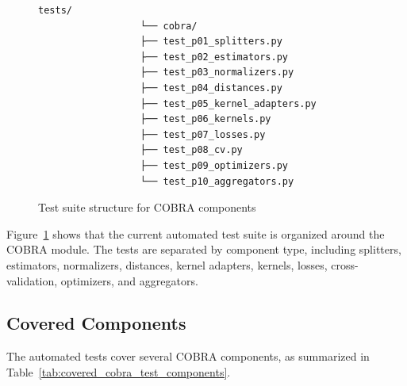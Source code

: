 \begin{figure}[H]
      \centering
      \begin{minipage}{0.85\textwidth}
            \begin{Verbatim}[fontsize=\footnotesize, baselinestretch=0.9]
                  tests/
                  └── cobra/
                  ├── test_p01_splitters.py
                  ├── test_p02_estimators.py
                  ├── test_p03_normalizers.py
                  ├── test_p04_distances.py
                  ├── test_p05_kernel_adapters.py
                  ├── test_p06_kernels.py
                  ├── test_p07_losses.py
                  ├── test_p08_cv.py
                  ├── test_p09_optimizers.py
                  └── test_p10_aggregators.py
            \end{Verbatim}
      \end{minipage}
      \caption{Test suite structure for COBRA components}
      \label{fig:cobra_test_suite_structure}
\end{figure}

Figure~\ref{fig:cobra_test_suite_structure} shows that the current automated test suite is organized around the COBRA module. The tests are separated by component type, including splitters, estimators, normalizers, distances, kernel adapters, kernels, losses, cross-validation, optimizers, and aggregators.

\subsection{Covered Components}

\hs The automated tests cover several COBRA components, as summarized in Table~\ref{tab:covered_cobra_test_components}.

